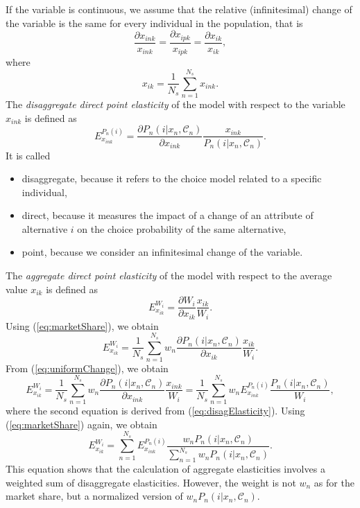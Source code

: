 \documentclass[12pt,a4paper]{article}
\newcommand{\req}[1]{(\ref{#1})}
\newcommand{\C}{\mathcal{C}}
\begin{document}
If the variable is continuous, we assume that the relative (infinitesimal) change of
the variable is the same for every individual in the population,  that
is
\begin{equation}
  \label{eq:uniformChange}
\frac{\partial x_{ink}}{x_{ink}} = \frac{\partial x_{ipk}}{x_{ipk}} = 
\frac{\partial x_{ik}}{x_{ik}}, 
\end{equation}
where
\begin{equation}
  \label{eq:avgx}
x_{ik} = \frac{1}{N_s} \sum_{n=1}^{N_s}{x_{ink}}.
\end{equation}
The \emph{disaggregate direct point elasticity} of the model with respect to
the variable $x_{ink}$ is defined as
\begin{equation}
\label{eq:disagElasticity}
  E_{x_{ink}}^{P_n(i)} = \frac{\partial P_n(i|x_n, \C_n)}{\partial
  x_{ink}} \frac{x_{ink}}{P_n(i|x_n, \C_n)}.
\end{equation}
It is called
\begin{itemize}
\item disaggregate,  because it refers to the choice model related to a
  specific individual, 
\item direct,  because it measures the impact of a change of an
    attribute of alternative $i$ on the choice probability of the
    same alternative, 
\item point,  because we consider an infinitesimal change of the
  variable. 
\end{itemize}
The \emph{aggregate direct point elasticity} of the model with
respect to the average value $x_{ik}$ is defined as
\begin{equation}
E_{x_{ik}}^{W_i} = \frac{\partial W_i}{\partial x_{ik}} \frac{x_{ik}}{W_i}.
\end{equation}
Using \req{eq:marketShare},  we obtain
\begin{equation}
E_{x_{ik}}^{W_i} = \frac{1}{N_s}  \sum_{n=1}^{N_s} w_n \frac{\partial
  P_n(i|x_n, \C_n)}{\partial x_{ik}} \frac{x_{ik}}{W_i}.
\end{equation}
From \req{eq:uniformChange},  we obtain
\begin{equation}
E_{x_{ik}}^{W_i} = \frac{1}{N_s}  \sum_{n=1}^{N_s} w_n \frac{\partial
  P_n(i|x_n, \C_n)}{\partial x_{ink}} \frac{x_{ink}}{W_i} =
\frac{1}{N_s}  \sum_{n=1}^{N_s} w_n E_{x_{ink}}^{P_n(i)}  \frac{P_n(i|x_n, \C_n)}{W_i}, 
\end{equation}
where the second equation is derived from \req{eq:disagElasticity}.
Using \req{eq:marketShare} again,  we obtain
\begin{equation}
\label{eq:aggDisagg}
  E_{x_{ik}}^{W_i} =  \sum_{n=1}^{N_s} 
E_{x_{ink}}^{P_n(i)}  \frac{w_n P_n(i|x_n, \C_n)}{ \sum_{n=1}^{N_s} w_n P_n(i|x_n, \C_n)}.
\end{equation}
This equation shows that the calculation of aggregate elasticities
involves a weighted sum of disaggregate elasticities. However,  the
weight is not $w_n$ as for the market share,  but a normalized version
of $w_n P_n(i|x_n, \C_n)$.
\end{document}
